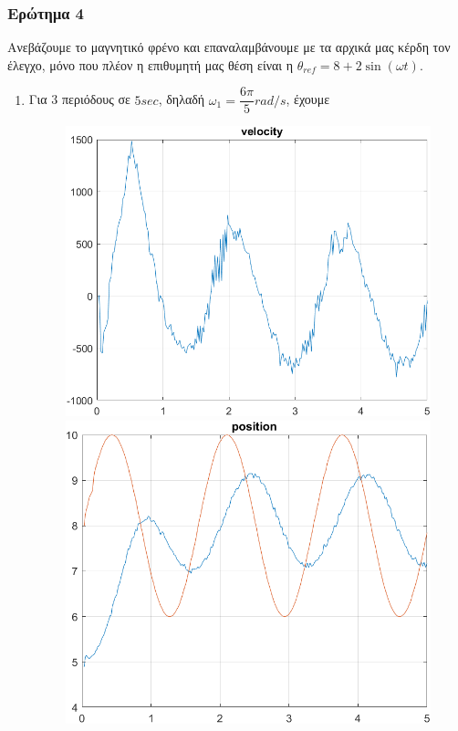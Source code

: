 \subsubsection{Ερώτημα 4}
Ανεβάζουμε το μαγνητικό φρένο και επαναλαμβάνουμε με τα αρχικά μας κέρδη τον έλεγχο, μόνο που πλέον η επιθυμητή μας θέση είναι η $θ_{ref} = 8+2\sin(ωt)$. 
\begin{enumerate}
	\item Για 3 περιόδους σε $5sec$, δηλαδή $ω_1 = \dfrac{6π}{5} rad/s$, έχουμε
\begin{figure}[H]
    \centering
    \begin{minipage}{0.45\textwidth}
        \includegraphics[width=\linewidth]{Images/lab2/4/1/vel2241.png}
    \end{minipage}
    \hfill
    \begin{minipage}{0.45\textwidth}
        \includegraphics[width=\linewidth]{Images/lab2/4/1/pos2241.png}
    \end{minipage}
    

\end{figure}
\end{enumerate}
